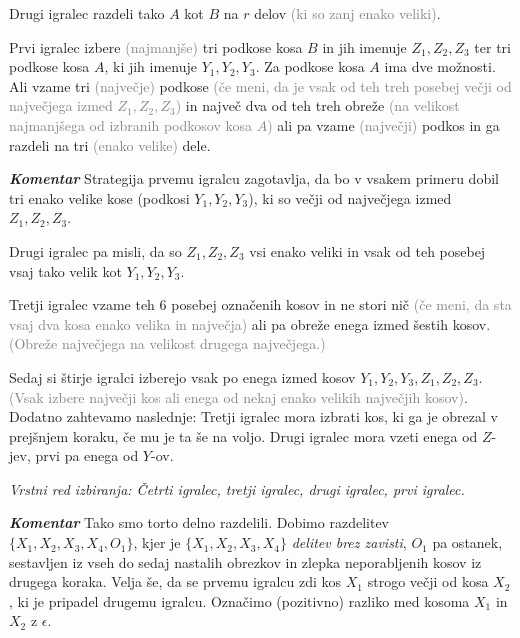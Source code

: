 \documentclass[a4paper,12pt]{article}
\begin{document}
\begin{protokol}


\item Drugi igralec razdeli tako $A$ kot $B$ na $r$ delov \textcolor{gray}{(ki so zanj enako veliki)}.

\item Prvi igralec izbere \textcolor{gray}{(najmanjše)} tri podkose kosa $B$ in jih imenuje $Z_1, Z_2, Z_3$ ter tri podkose kosa $A$, ki jih imenuje $Y_1, Y_2, Y_3$. Za podkose kosa $A$ ima dve možnosti. Ali vzame tri \textcolor{gray}{(največje)} podkose \textcolor{gray}{(če meni, da je vsak od teh treh posebej večji od največjega izmed $Z_1, Z_2, Z_3$)} in največ dva od teh treh obreže \textcolor{gray}{(na velikost najmanjšega od izbranih podkosov kosa $A$)} ali pa vzame \textcolor{gray}{(največji)} podkos in ga razdeli na tri \textcolor{gray}{(enako velike)} dele.

\item [\textbf{\em Komentar}] Strategija prvemu igralcu zagotavlja, da bo v vsakem primeru dobil tri enako velike kose (podkosi $Y_1, Y_2, Y_3$), ki so večji od največjega izmed $Z_1, Z_2, Z_3$.


 Drugi igralec pa misli, da so $Z_1, Z_2, Z_3$ vsi enako veliki in vsak od teh posebej vsaj tako velik kot $Y_1, Y_2, Y_3$.

\item Tretji igralec vzame teh 6 posebej označenih kosov in ne stori nič \textcolor{gray}{(če meni, da sta vsaj dva kosa enako velika in največja)} ali pa obreže enega izmed šestih kosov. \textcolor{gray}{(Obreže največjega na velikost drugega največjega.)}

\item  Sedaj si štirje igralci izberejo vsak po enega izmed kosov $Y_1, Y_2, Y_3, Z_1, Z_2, Z_3$. \textcolor{gray}{(Vsak izbere največji kos ali enega od nekaj enako velikih največjih kosov)}. Dodatno zahtevamo naslednje: Tretji igralec mora izbrati kos, ki ga je obrezal v prejšnjem koraku, če mu je ta še na voljo. Drugi igralec mora vzeti enega od $Z$-jev, prvi pa enega od $Y$-ov.

\textsl{Vrstni red izbiranja: Četrti igralec, tretji igralec, drugi igralec, prvi igralec.}

\item [\textbf{\em Komentar}] Tako smo torto delno razdelili. Dobimo razdelitev ${\{X_1, X_2, X_3, X_4, O_1\}}$, kjer je ${\{X_1, X_2, X_3, X_4\}}$ {\em delitev brez zavisti}, $O_1$ pa ostanek, sestavljen iz vseh do sedaj nastalih obrezkov in zlepka neporabljenih kosov iz drugega koraka. Velja še, da se prvemu igralcu zdi kos $X_1$ strogo večji od kosa $X_2$, ki je pripadel drugemu igralcu. Označimo (pozitivno) razliko med kosoma $X_1$ in $X_2$ z $\epsilon$.


\end{protokol}
\end{document}

